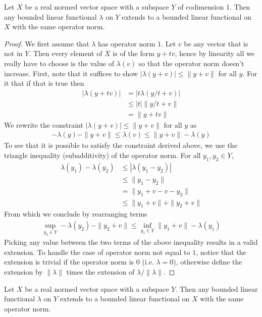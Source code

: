\begin{lem} Let $X$ be a real normed vector space with a subspace $Y$
  of codimension 1.  Then any bounded linear functional $\lambda$ on
  $Y$ extends to a bounded linear functional on $X$ with the same
  operator norm.
\end{lem}
\begin {proof}
We first assume that $\lambda$ has operator norm $1$.
Let $v$ be any vector that is not in $Y$.  Then every element of $X$
is of the form $y + tv$, hence by linearity all we really have to
choose is the value of $\lambda(v)$ so that the operator norm doesn't
increase.  
First, note that it suffices to show $|\lambda(y+v)| \leq
\|y+v\|$ for all $y$.  For it that if that is true then
\begin{align*}
|\lambda(y + tv)| &= |t\lambda(y/t + v)| \\
&\leq |t| \|y/t + v\| \\
&= \|y + tv\| 
\end{align*}
We rewrite the constraint $|\lambda(y+v)| \leq
\|y+v\|$ for all $y$ as
\begin{align*}
-\lambda(y) - \|y+v\| \leq \lambda(v) \leq  \|y+v\| - \lambda(y)
\end{align*}
To see that it is possible to satisfy the constraint derived above, we
use the triangle inequality (subadditivity) of the operator norm.  For
all $y_1,y_2 \in Y$,
\begin{align*}
\lambda(y_1) - \lambda(y_2) &\leq|\lambda(y_1 - y_2)| \\
&\leq \|y_1 - y_2\| \\
&= \|y_1 + v - v - y_2 \| \\
&\leq \|y_1 + v\| + \|y_2 + v\| 
\end{align*}
From which we conclude by rearranging terms 
\begin{align*}
\sup_{y_2 \in Y} -\lambda(y_2) - \|y_2 + v\| \leq \inf_{y_1 \in Y} \|y_1 + v\| - \lambda(y_1)
\end{align*} 
Picking any value between the two terms of the above inequality
results in a valid extension.
To handle the case of operator norm not equal to $1$, notice that the
extension is trivial if the operator norm is $0$ (i.e. $\lambda=0$), otherwise define the
extension by $\|\lambda\|$ times the extension of $\lambda/\|\lambda\|$.
\end {proof}
\begin{thm}
Let $X$ be a real normed vector space with a subspace $Y$.  Then any bounded linear functional $\lambda$ on  $Y$ extends to a bounded linear functional on $X$ with the same operator norm.
\end{thm}
